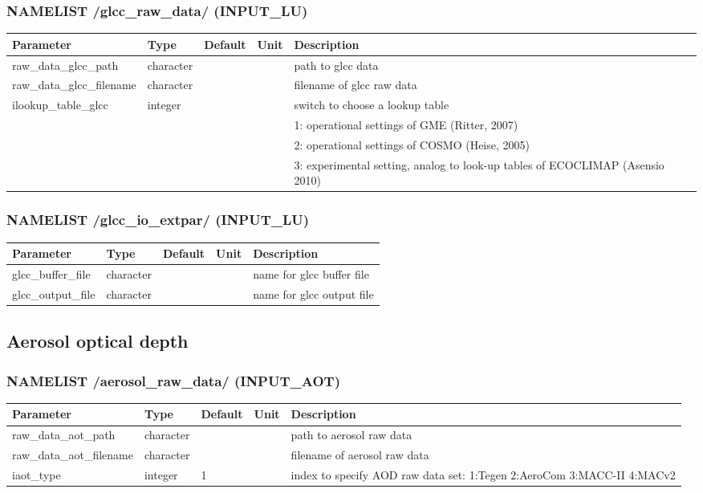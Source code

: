 \documentclass[a4paper,10pt,DIV14,BCOR1cm,titlepage,twoside]{scrartcl}
\providecommand{\tabularnewline}{\\}
\begin{document}
\subsubsection*{NAMELIST /glcc\_raw\_data/ (INPUT\_LU)}

\begin{longtable}{|p{4cm}|p{1.5cm}|p{1.5cm}|p{1cm}|p{6cm}|}
\hline 
\textbf{Parameter}& \textbf{Type}&\textbf{Default}& \textbf{Unit}& \textbf{Description}
\tabularnewline
\hline
\endhead
\hline 
raw\_data\_glcc\_path & character & &  & path to glcc data \tabularnewline
\hline 
raw\_data\_glcc\_filename & character & &  & filename of glcc raw data \tabularnewline
\hline
ilookup\_table\_glcc & integer & & &  switch to choose a lookup table
\tabularnewline
 & & & & 1: operational settings of GME (Ritter, 2007)\tabularnewline
 & & & & 2: operational settings of COSMO (Heise, 2005)\tabularnewline
 & & & & 3: experimental setting, analog to look-up tables of ECOCLIMAP (Asensio 2010)\tabularnewline
\hline
\bottomrule
\end{longtable}

\subsubsection*{NAMELIST /glcc\_io\_extpar/ (INPUT\_LU)}
\begin{longtable}{|p{4cm}|p{1.5cm}|p{1.5cm}|p{1cm}|p{6cm}|}
\hline 
\textbf{Parameter}& \textbf{Type}& \textbf{Default}& \textbf{Unit}& \textbf{Description}
\tabularnewline
\hline
\endhead
\hline
glcc\_buffer\_file & character & &  & name for glcc buffer file
\tabularnewline
\hline 
glcc\_output\_file & character & &  & name for glcc output file \tabularnewline
\hline
\bottomrule
\end{longtable}

\subsection{Aerosol optical depth}\label{namelist_input_for_extpar_aot}

\subsubsection*{NAMELIST /aerosol\_raw\_data/ (INPUT\_AOT)}

\begin{longtable}{|p{4cm}|p{1.5cm}|p{1.5cm}|p{1cm}|p{6cm}|}
\hline 
\textbf{Parameter}& \textbf{Type}& \textbf{Default}& \textbf{Unit}& \textbf{Description}
\tabularnewline
\hline
\endhead
\hline 
raw\_data\_aot\_path & character & &  & path to aerosol raw data \tabularnewline
\hline 
raw\_data\_aot\_filename & character & &  & filename of aerosol raw data \tabularnewline
\hline 
iaot\_type & integer &1 &  & index to specify AOD raw data set: 1:Tegen 2:AeroCom 3:MACC-II 4:MACv2 \tabularnewline
\hline
\bottomrule
\end{longtable}
\end{document}
